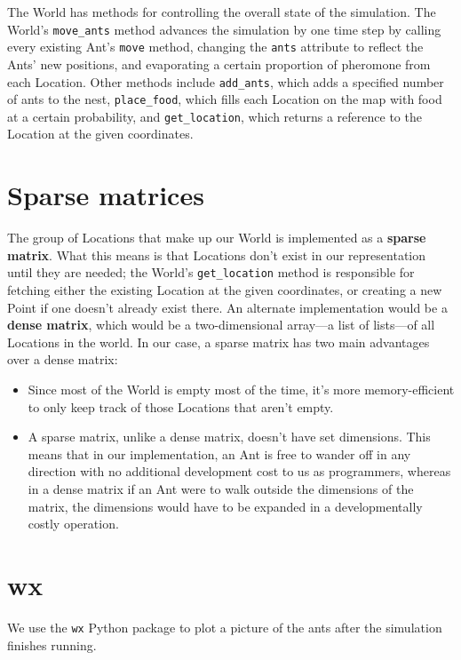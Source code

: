 The World has methods for controlling the overall state of the simulation. The World's \texttt{move\_ants} method advances the simulation by one time step by calling every existing Ant's \texttt{move} method, changing the \texttt{ants} attribute to reflect the Ants' new positions, and evaporating a certain proportion of pheromone from each Location. Other methods include \texttt{add\_ants}, which adds a specified number of ants to the nest, \texttt{place\_food}, which fills each Location on the map with food at a certain probability, and \texttt{get\_location}, which returns a reference to the Location at the given coordinates.

\section{Sparse matrices}

The group of Locations that make up our World is implemented as a \textbf{sparse matrix}. What this means is that Locations don't exist in our representation until they are needed; the World's \texttt{get\_location} method is responsible for fetching either the existing Location at the given coordinates, or creating a new Point if one doesn't already exist there. An alternate implementation would be a \textbf{dense matrix}, which would be a two-dimensional array---a list of lists---of all Locations in the world. In our case, a sparse matrix has two main advantages over a dense matrix:

\begin{itemize}
\item Since most of the World is empty most of the time, it's more memory-efficient to only keep track of those Locations that aren't empty.
\item A sparse matrix, unlike a dense matrix, doesn't have set dimensions. This means that in our implementation, an Ant is free to wander off in any direction with no additional development cost to us as programmers, whereas in a dense matrix if an Ant were to walk outside the dimensions of the matrix, the dimensions would have to be expanded in a developmentally costly operation.
\end{itemize}

\section{wx}

We use the \texttt{wx} Python package to plot a picture of the ants after the simulation finishes running. 

